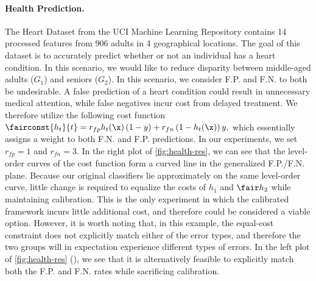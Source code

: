 \paragraph{Health Prediction.}
  The Heart Dataset from the UCI Machine Learning Repository contains 14 processed features
  from 906 adults in 4 geographical locations. The goal of this dataset is to
  accurately predict whether or not an
  individual has a heart condition. In this scenario, we would like to reduce
  disparity between
  middle-aged adults ($G_1$) and seniors ($G_2$).
  In this scenario, we consider F.P. and F.N. to both be undesirable.
  A false prediction of a heart condition could result in unnecessary medical attention, while
  false negatives incur cost from delayed treatment. We therefore utilize the following cost function
  $
    \fairconst{h_t}{t} = r_{fp} h_t(\x) \left(1 - y\right) + r_{fn} \left( 1 - h_t(\x) \right) y,
  $
  which essentially assigns a weight to both F.N. and F.P. predictions.
  In our experiments, we set $r_{fp}=1$ and $r_{fn}=3$.
  In the right plot of \autoref{fig:health-res}, we can see that
  the level-order curves of the cost function form a curved
  line in the generalized F.P./F.N. plane.
  Because our
  original classifiers lie approximately
  on the same level-order curve, little change is required to equalize the costs of
  $h_1$ and $\fair h_2$ while maintaining calibration.
  This is the only experiment in which the calibrated framework
  incurs little additional cost, and therefore could be considered a viable option.
  However, it is worth noting that, in this example, the equal-cost constraint
  does not explicitly match either of the error types, and therefore the two
  groups will in expectation experience different types of errors.
  In the left plot of \autoref{fig:health-res} (\hardtetal{}), we see that it is
  alternatively feasible to explicitly match both the F.P. and F.N. rates while sacrificing
  calibration.

